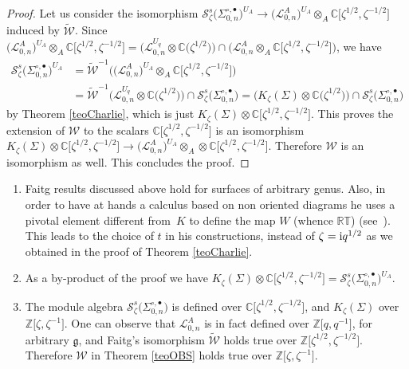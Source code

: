 \documentclass[pdftex]{sigma}%
\numberwithin{equation}{section}
\numberwithin{figure}{section}
\newcommand{\mc}{\mathbb{C}}
\newcommand{\mz}{\mathbb{Z}}
\newcommand{\Ll}{{\mathcal L}}
\newcommand{\ra}{\rightarrow}
\begin{document}
\begin{proof}
Let us consider the isomorphism $\mathcal{S}_\zeta^s\big(\Sigma_{0,n}^{\circ,\bullet}\big)^{U_A} \ra \big(\Ll_{0,n}^A\big)^{U_A} \otimes_A \mc\big[\zeta^{1/2},\zeta^{-1/2}\big]$ induced by $\tilde{\mathcal{W}}$. Since $\big(\Ll_{0,n}^A\big)^{U_A} \otimes_A \mc\big[\zeta^{1/2},\zeta^{-1/2}\big] = \big(\Ll_{0,n}^{U_q}\otimes \mc\big(\zeta^{1/2}\big)\big)\cap \big(\Ll_{0,n}^A\otimes_A \mc\big[\zeta^{1/2},\zeta^{-1/2}\big]\big)$, we have
\begin{align*}
\mathcal{S}_\zeta^s\big(\Sigma_{0,n}^{\circ,\bullet}\big)^{U_A} & = \tilde{\mathcal{W}}^{-1}\big(\big(\Ll_{0,n}^A\big)^{U_A} \otimes_A \mc\big[\zeta^{1/2},\zeta^{-1/2}\big]\big) \\ & = \tilde{\mathcal{W}}^{-1}\big(\Ll_{0,n}^{U_q}\otimes \mc\big(\zeta^{1/2}\big)\big) \cap \mathcal{S}_\zeta^s\big(\Sigma_{0,n}^{\circ,\bullet}\big) = \big(K_\zeta(\Sigma)\otimes \mc\big(\zeta^{1/2}\big)\big) \cap \mathcal{S}_\zeta^s\big(\Sigma_{0,n}^{\circ,\bullet}\big)
\end{align*}
by Theorem \ref{teoCharlie}, which is just $K_\zeta(\Sigma)\otimes \mc\big[\zeta^{1/2},\zeta^{-1/2}\big]$. This proves the extension of $\mathcal{W}$ to the scalars $\mc\big[\zeta^{1/2},\zeta^{-1/2}\big]$ is an isomorphism $K_\zeta(\Sigma) \otimes \mc\big[\zeta^{1/2},\zeta^{-1/2}\big]\ra \big(\Ll_{0,n}^A\big)^{U_A}\otimes_A \otimes \mc\big[\zeta^{1/2},\zeta^{-1/2}\big]$. Therefore $\mathcal{W}$ is an isomorphism as well. This concludes the proof. \end{proof}

\begin{remk}\label{teoOBSrem} \quad
\begin{enumerate}\itemsep=0pt

\item[$(1)$] Faitg results discussed above hold for surfaces of arbitrary genus. Also, in order to have at hands a calculus based on non oriented diagrams he uses a pivotal element different from~$K$ to define the map $W$ (whence $\mathbb{RT}$) (see~\cite[Remark~5.2]{Faitg4}). This leads to the choice of $t$ in his constructions, instead of $\zeta={\rm i}q^{1/2}$ as we obtained in the proof of Theorem \ref{teoCharlie}.

\item[$(2)$] As a by-product of the proof we have $K_\zeta(\Sigma) \otimes \mc\big[\zeta^{1/2},\zeta^{-1/2}\big] = \mathcal{S}_\zeta^s\big(\Sigma_{0,n}^{\circ,\bullet}\big)^{U_A}$.

\item[$(3)$] The module algebra $\mathcal{S}_\zeta^s\big(\Sigma_{0,n}^{\circ,\bullet}\big)$ is defined over $\mc\big[\zeta^{1/2},\zeta^{-1/2}\big]$, and $K_\zeta(\Sigma)$ over $\mz\big[\zeta,\zeta^{-1}\big]$. One can observe that $\Ll_{0,n}^A$ is in fact defined over $\mz\big[q,q^{-1}\big]$, for arbitrary $\mathfrak{g}$, and Faitg's isomorphism $\tilde{\mathcal{W}}$ holds true over $\mz\big[\zeta^{1/2},\zeta^{-1/2}\big]$. Therefore $\mathcal{W}$ in Theorem \ref{teoOBS} holds true over $\mz\big[\zeta,\zeta^{-1}\big]$.
\end{enumerate}
\end{remk}
\end{document}
